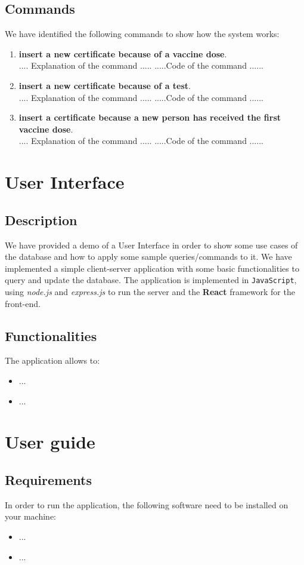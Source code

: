 \documentclass{article}
\begin{document}
\subsection{Commands}
We have identified the following commands to show how the system works:\\
\begin{enumerate}
    \item \textbf{insert a new certificate because of a vaccine dose}.\\ .... Explanation of the command .....
    .....Code of the command ......
    \item \textbf{insert a new certificate because of a test}.\\ .... Explanation of the command .....
    .....Code of the command ......
    \item \textbf{insert a certificate because a new person has received the first vaccine dose}.\\ .... Explanation of the command .....
    .....Code of the command ......
\end{enumerate}
\section{User Interface}
    \subsection{Description}
    We have provided a demo of a User Interface in order to show some use cases of the database and how to apply some sample queries/commands to it. We have implemented a simple client-server application with some basic functionalities to query and update the database. The application is implemented in \verb|JavaScript|, using \textit{node.js} and \textit{express.js} to run the server and the \textbf{React} framework for the front-end.
    \subsection{Functionalities}
    The application allows to:
    \begin{itemize}
    \item ...
    \item ...
    \end{itemize}
\section{User guide}
\subsection{Requirements}
In order to run the application, the following software need to be installed on your machine:
\begin{itemize}
    \item ...
    \item ...
\end{itemize}
\end{document}
